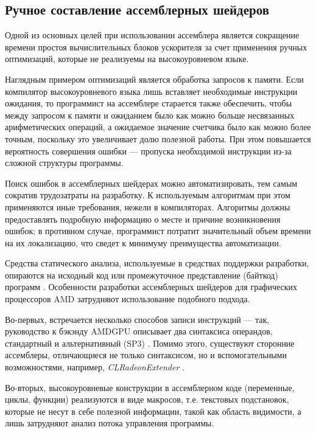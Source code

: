 \documentclass[a4paper,14pt]{extarticle}
\begin{document}
{\subsection{Ручное составление ассемблерных шейдеров}

Одной из основных целей при использовании ассемблера является сокращение времени
простоя вычислительных блоков ускорителя за счет применения ручных оптимизаций,
которые не реализуемы на высокоуровневом языке.

Наглядным примером оптимизаций является обработка запросов к памяти. Если
компилятор высокоуровневого языка лишь вставляет необходимые инструкции ожидания,
то программист на ассемблере старается также обеспечить, чтобы между запросом к памяти
и ожиданием было как можно больше несвязанных арифметических операций,
а ожидаемое значение счетчика было как можно более точным, поскольку
это увеличивает долю полезной работы. При этом повышается вероятность совершения
ошибки — пропуска необходимой инструкции из-за сложной структуры программы.

Поиск ошибок в ассемблерных шейдерах можно автоматизировать, тем самым сократив
трудозатраты на разработку. К используемым алгоритмам при этом применяются иные требования,
нежели в компиляторах. Алгоритмы должны предоставлять подробную информацию о месте
и причине возникновения ошибок; в противном случае, программист потратит значительный
объем времени на их локализацию, что сведет к минимуму преимущества автоматизации.

Средства статического анализа, используемые в средствах поддержки разработки,
опираются на исходный код или промежуточное представление (байткод) программ
\cite{static-code-analysis}. Особенности разработки ассемблерных шейдеров
для графических процессоров AMD затрудняют использование подобного подхода.

Во-первых, встречается несколько способов записи инструкций — так, руководство к бэкэнду
AMDGPU описывает два синтаксиса операндов, стандартный и альтернативный (SP3) \cite{gcn-asm-syntax}.
Помимо этого, существуют сторонние ассемблеры, отличающиеся не только синтаксисом,
но и вспомогательными возможностями, например, \textit{CLRadeonExtender} \cite{clrx}.

Во-вторых, высокоуровневые конструкции в ассемблерном коде (переменные, циклы, функции)
реализуются в виде макросов, т.е. текстовых подстановок, которые не несут в себе полезной
информации, такой как область видимости, а лишь затрудняют анализ потока управления программы.

}
\end{document}
